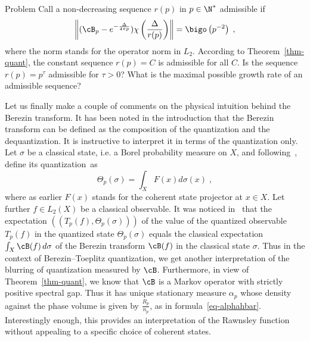 \begin{enonce}
{Problem}\label{prob}
Call a non-decreasing sequence $r(p)$
in $p \in \N^*$ \textup{admissible} if
\[
\left\|(\cB_p-e^{-\frac{\Delta}{4\pi p}}) \chi\left(\frac{\Delta}{r(p)}\right)\right\| = \bigo\left(p^{-2}\right)\;,
\]
where the norm stands for the operator norm in $L_2$. According to Theorem~\ref{thm-quant}, the constant sequence $r(p) = C$ is admissible for all $C$. Is the sequence $r(p) = p^\tau$ admissible for $\tau >0$? What is the maximal possible growth rate of an admissible sequence?
\end{enonce}



Let us finally make a couple of comments on the physical intuition behind the Berezin transform. It has been noted in the introduction that the Berezin transform can be defined as the composition of the quantization and the dequantization. It is instructive to interpret it in terms of the quantization only. Let $\sigma$ be a classical state, i.e. a Borel probability measure on $X$, and following~\cite{CP1}, define its quantization~as
\[
\Theta_p(\sigma) = \int_X F(x)d\sigma(x)\;,
\]
where as earlier $F(x)$ stands for the coherent state projector at $x\in X$. Let further $f \in L_2(X)$ be a classical observable. It was noticed in~\cite[(11)]{CP1} that the expectation $((T_p(f),\Theta_p(\sigma)))$ of the value of the quantized observable $T_p(f)$ in the quantized state $\Theta_p(\sigma)$ equals the classical expectation $\int_X \cB(f)\,d\sigma$ of the Berezin transform $\cB(f)$ in the classical state $\sigma$. Thus in the context of Berezin--Toeplitz quantization, we get another interpretation of the blurring of quantization measured by $\cB$. Furthermore, in view of Theorem~\ref{thm-quant}, we know that $\cB$ is a Markov operator with strictly positive spectral gap. Thus it has unique stationary measure $\alpha_p$ whose density against the phase volume is given by $\frac{R_p}{n_p}$, as in formula~\eqref{eq-alphahbar}. Interestingly enough, this provides an interpretation of the Rawnsley function without appealing to a specific choice of coherent states.

